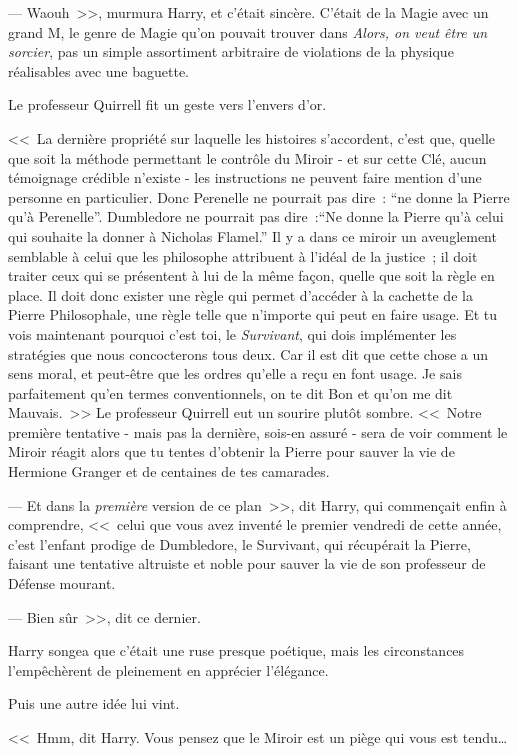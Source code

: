 --- Waouh~>>, murmura Harry, et c'était sincère. C'était de la Magie avec un grand M, le genre de Magie qu'on pouvait trouver dans \emph{Alors, on veut être un sorcier}, pas un simple assortiment arbitraire de violations de la physique réalisables avec une baguette.

Le professeur Quirrell fit un geste vers l'envers d'or.

<<~La dernière propriété sur laquelle les histoires s'accordent, c'est que, quelle que soit la méthode permettant le contrôle du Miroir - et sur cette Clé, aucun témoignage crédible n'existe - les instructions ne peuvent faire mention d'une personne en particulier. Donc Perenelle ne pourrait pas dire~: “ne donne la Pierre qu'à Perenelle”. Dumbledore ne pourrait pas dire~:“Ne donne la Pierre qu'à celui qui souhaite la donner à Nicholas Flamel.” Il y a dans ce miroir un aveuglement semblable à celui que les philosophe attribuent à l'idéal de la justice~; il doit traiter ceux qui se présentent à lui de la même façon, quelle que soit la règle en place. Il doit donc exister une règle qui permet d'accéder à la cachette de la Pierre Philosophale, une règle telle que n'importe qui peut en faire usage. Et tu vois maintenant pourquoi c'est toi, le \emph{Survivant}, qui dois implémenter les stratégies que nous concocterons tous deux. Car il est dit que cette chose a un sens moral, et peut-être que les ordres qu'elle a reçu en font usage. Je sais parfaitement qu'en termes conventionnels, on te dit Bon et qu'on me dit Mauvais.~>> Le professeur Quirrell eut un sourire plutôt sombre. <<~Notre première tentative - mais pas la dernière, sois-en assuré - sera de voir comment le Miroir réagit alors que tu tentes d'obtenir la Pierre pour sauver la vie de Hermione Granger et de centaines de tes camarades.

--- Et dans la \emph{première} version de ce plan~>>, dit Harry, qui commençait enfin à comprendre, <<~celui que vous avez inventé le premier vendredi de cette année, c'est l'enfant prodige de Dumbledore, le Survivant, qui récupérait la Pierre, faisant une tentative altruiste et noble pour sauver la vie de son professeur de Défense mourant.

--- Bien sûr~>>, dit ce dernier.

Harry songea que c'était une ruse presque poétique, mais les circonstances l'empêchèrent de pleinement en apprécier l'élégance.

Puis une autre idée lui vint.

<<~Hmm, dit Harry. Vous pensez que le Miroir est un piège qui vous est tendu…

